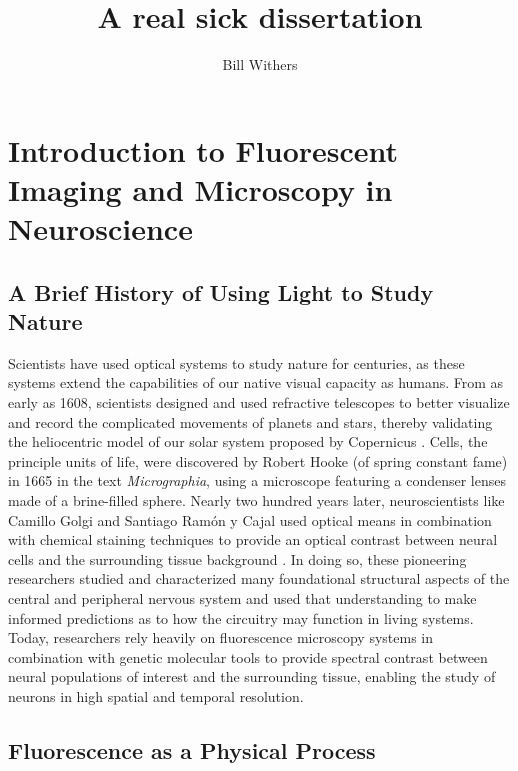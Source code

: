 \documentclass [PhD] {UCLAthesis}
\title          {A real sick dissertation}
\author         {Bill Withers}
\begin{document}
\makeintropages

\chapter{Introduction to Fluorescent Imaging and Microscopy in Neuroscience}\label{ch:Intro}
\section{A Brief History of Using Light to Study Nature}
Scientists have used optical systems to study nature for centuries, as these systems extend the capabilities of our native visual capacity as humans. From as early as 1608, scientists designed and used refractive telescopes to better visualize and record the complicated movements of planets and stars, thereby validating the heliocentric model of our solar system proposed by Copernicus \cite{Copernicus1543}. Cells, the principle units of life, were discovered by Robert Hooke (of spring constant fame) in 1665 in the text \textit{Micrographia}, using a microscope featuring a condenser lenses made of a brine-filled sphere\cite{Hooke1665}. Nearly two hundred years later, neuroscientists like Camillo Golgi and Santiago Ramón y Cajal used optical means in combination with chemical staining techniques to provide an optical contrast between neural cells and the surrounding tissue background \cite{Golgi1873, Cajal1899}. In doing so, these pioneering researchers studied and characterized many foundational structural aspects of the central and peripheral nervous system and used that understanding to make informed predictions as to how the circuitry may function in living systems. Today, researchers rely heavily on fluorescence microscopy systems in combination with genetic molecular tools to provide spectral contrast between neural populations of interest and the surrounding tissue, enabling the study of neurons in high spatial and temporal resolution. 

\section{Fluorescence as a Physical Process}\label{sec:fluorescence_physical}
\end{document}
